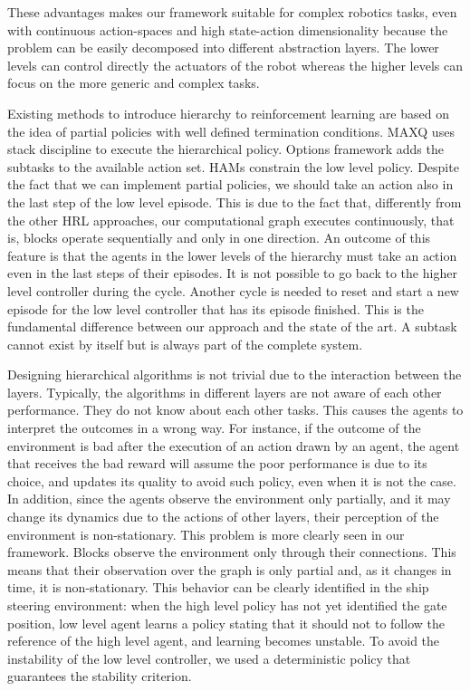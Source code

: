 These advantages makes our framework suitable for complex robotics tasks, even with continuous action-spaces and high state-action dimensionality because the problem can be easily decomposed into different abstraction layers. The lower levels can control directly the actuators of the robot whereas the higher levels can focus on the more generic and complex tasks. 

Existing methods to introduce hierarchy to reinforcement learning are based on the idea of partial policies with well defined termination conditions. MAXQ uses stack discipline to execute the hierarchical policy. Options framework adds the subtasks to the available action set. HAMs constrain the low level policy. Despite the fact that we can implement partial policies, we should take an action also in the last step of the low level episode. This is due to the fact that, differently from the other HRL approaches, our computational graph executes continuously, that is, blocks operate sequentially and only in one direction. An outcome of this feature is that the agents in the lower levels of the hierarchy must take an action even in the last steps of their episodes. It is not possible to go back to the higher level controller during the cycle. Another cycle is needed to reset and start a new episode for the low level controller that has its episode finished. This is the fundamental difference between our approach and the state of the art. A subtask cannot exist by itself but is always part of the complete system.

Designing hierarchical algorithms is not trivial due to the interaction between the layers. Typically, the algorithms in different layers are not aware of each other performance. They do not know about each other tasks. This causes the agents to interpret the outcomes in a wrong way. For instance, if the outcome of the environment is bad after the execution of an action drawn by an agent, the agent that receives the bad reward will assume the poor performance is due to its choice, and updates its quality to avoid such policy, even when it is not the case. In addition, since the agents observe the environment only partially, and it may change its dynamics due to the actions of other layers, their perception of the environment is non-stationary. This problem is more clearly seen in our framework. Blocks observe the environment only through their connections. This means that their observation over the graph is only partial and, as it changes in time, it is non-stationary. This behavior can be clearly identified in the ship steering environment: when the high level policy has not yet identified the gate position, low level agent learns a policy stating that it should not to follow the reference of the high level agent, and learning becomes unstable. To avoid the instability of the low level controller, we used a deterministic policy that guarantees the stability criterion. 

